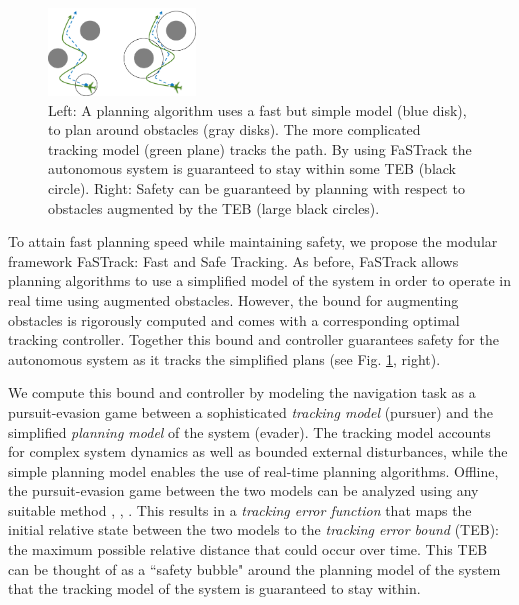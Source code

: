  \begin{figure}
 	\centering
 	\includegraphics[width=0.35\textwidth]{fig/chasing}
 	\caption{Left: A planning algorithm uses a fast but simple model (blue disk), to plan around obstacles (gray disks). The more complicated tracking model (green plane) tracks the path. By using FaSTrack the autonomous system is guaranteed to stay within some TEB (black circle). Right: Safety can be guaranteed by planning with respect to obstacles augmented by the TEB (large black circles).}
 	\label{fig:chasing}
 \end{figure}

To attain fast planning speed while maintaining safety, we propose the modular framework FaSTrack: Fast and Safe Tracking.  As before, FaSTrack allows planning algorithms to use a simplified model of the system in order to operate in real time using augmented obstacles.  However, the bound for augmenting obstacles is rigorously computed and comes with a corresponding optimal tracking controller. Together this bound and controller guarantees safety for the autonomous system as it tracks the simplified plans (see Fig. \ref{fig:chasing}, right).  

We compute this bound and controller by modeling the navigation task as a pursuit-evasion game between a sophisticated \textit{tracking model} (pursuer) and the simplified \textit{planning model} of the system (evader). 
The tracking model accounts for complex system dynamics as well as bounded external disturbances, while the simple planning model enables the use of real-time planning algorithms. 
Offline, the pursuit-evasion game between the two models can be analyzed using any suitable method , \cite{SinghChenEtAl2018},  \cite{royo2018classification}. 
This results in a \textit{tracking error function} that maps the initial relative state between the two models to the \textit{tracking error bound} (TEB): the maximum possible relative distance that could occur over time. 
This TEB can be thought of as a ``safety bubble" around the planning model of the system that the tracking model of the system is guaranteed to stay within.

